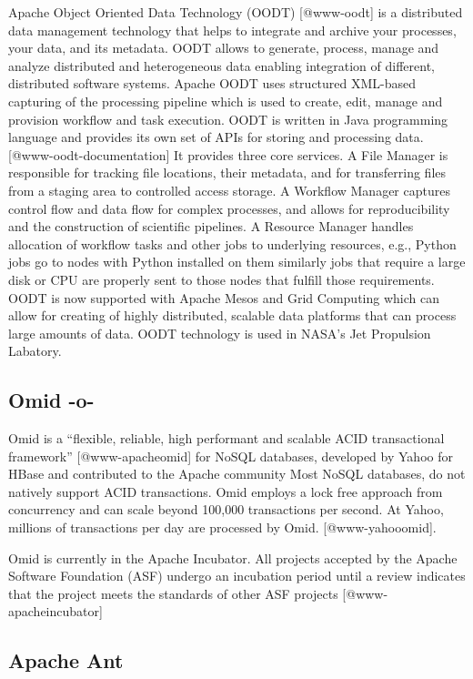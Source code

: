 Apache Object Oriented Data Technology (OODT) [@www-oodt] is a
distributed data management technology that helps to integrate and
archive your processes, your data, and its metadata. OODT allows to
generate, process, manage and analyze distributed and heterogeneous
data enabling integration of different, distributed software
systems. Apache OODT uses structured XML-based capturing of the
processing pipeline which is used to create, edit, manage and
provision workflow and task execution. OODT is written in Java
programming language and provides its own set of APIs for storing and
processing data. [@www-oodt-documentation] It provides three core
services. A File Manager is responsible for tracking file locations,
their metadata, and for transferring files from a staging area to
controlled access storage. A Workflow Manager captures control flow
and data flow for complex processes, and allows for reproducibility
and the construction of scientific pipelines. A Resource Manager
handles allocation of workflow tasks and other jobs to underlying
resources, e.g., Python jobs go to nodes with Python installed on them
similarly jobs that require a large disk or CPU are properly sent to
those nodes that fulfill those requirements. OODT is now supported
with Apache Mesos and Grid Computing which can allow for creating of
highly distributed, scalable data platforms that can process large
amounts of data. OODT technology is used in NASA's Jet Propulsion
Labatory.

\subsection{Omid -o-}

Omid is a ``flexible, reliable, high performant and scalable ACID
transactional framework'' [@www-apacheomid] for NoSQL databases,
developed by Yahoo for HBase and contributed to the Apache community
Most NoSQL databases, do not natively support ACID transactions. Omid
employs a lock free approach from concurrency and can scale beyond
100,000 transactions per second. At Yahoo, millions of transactions
per day are processed by Omid. [@www-yahooomid].

Omid is currently in the Apache Incubator.  All projects accepted by
the Apache Software Foundation (ASF) undergo an incubation period
until a review indicates that the project meets the standards of other
ASF projects [@www-apacheincubator]


\subsection{Apache Ant}


